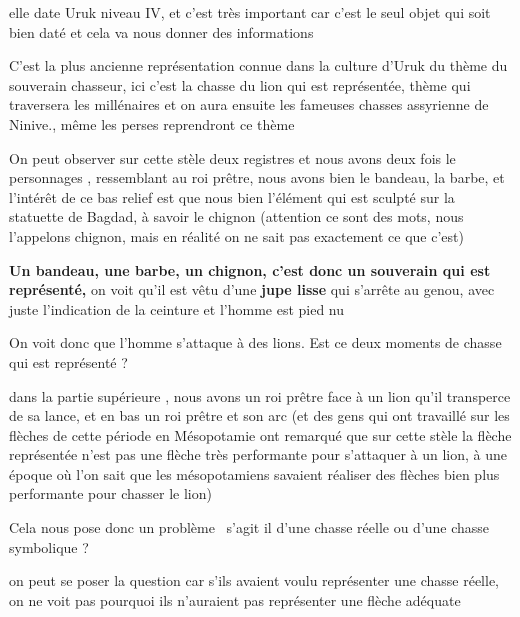 \documentclass[a4paper]{article}
\begin{document}
{
elle date Uruk niveau IV, et c'est très important car c'est le seul objet qui soit bien daté et cela va nous donner des
informations}


\bigskip

{
C'est la plus ancienne représentation connue dans la culture d'Uruk du thème du souverain chasseur, ici c'est la chasse
du lion qui est représentée, thème qui traversera les millénaires et on aura ensuite les fameuses chasses assyrienne de
Ninive., même les perses reprendront ce thème }


\bigskip


\bigskip

{
On peut observer sur cette stèle deux registres et nous avons deux fois le personnages , ressemblant au roi prêtre, nous
avons bien le bandeau, la barbe, et l'intérêt de ce bas relief est que nous bien l'élément qui est sculpté sur la
statuette de Bagdad, à savoir le chignon (attention ce sont des mots, nous l'appelons chignon, mais en réalité on ne
sait pas exactement ce que c'est)}

{
\textbf{Un bandeau, une barbe, un chignon, c'est donc un souverain qui est représenté,} on voit qu'il est vêtu d'une
\textbf{jupe lisse} qui s'arrête au genou, avec juste l'indication de la ceinture et l'homme est pied nu}


\bigskip

{
On voit donc que l'homme s'attaque à des lions. Est ce deux moments de chasse qui est représenté ? }

{
dans la partie supérieure , nous avons un roi prêtre face à un lion qu'il transperce de sa lance, et en bas un roi
prêtre et son arc (et des gens qui ont travaillé sur les flèches de cette période en Mésopotamie ont remarqué que sur
cette stèle la flèche représentée n'est pas une flèche très performante pour s'attaquer à un lion, à une époque où l'on
sait que les mésopotamiens savaient réaliser des flèches bien plus performante pour chasser le lion)}


\bigskip

{
Cela nous pose donc un problème \ s'agit il d'une chasse réelle ou d'une chasse symbolique ?}

{
on peut se poser la question car s'ils avaient voulu représenter une chasse réelle, on ne voit pas pourquoi ils
n'auraient pas représenter une flèche adéquate}
\end{document}
